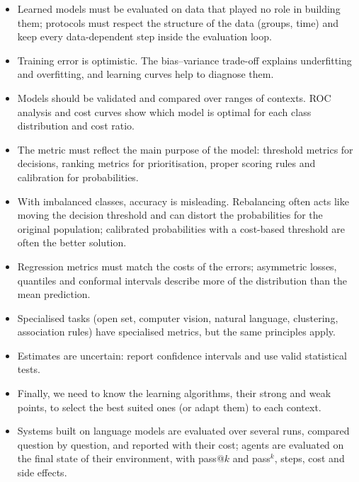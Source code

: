 \begin{itemize}
  \item Learned models must be evaluated on data that played no
        role in building them; protocols must respect the structure of the data (groups,
        time) and keep every data-dependent step inside the evaluation loop.
  \item Training error is optimistic. The bias--variance trade-off explains underfitting and
        overfitting, and learning curves help to diagnose them.
  \item Models should be validated and compared over ranges of contexts. ROC analysis and cost
        curves show which model is optimal for each class distribution and cost ratio.
  \item The metric must reflect the main purpose of the model: threshold metrics for decisions,
        ranking metrics for prioritisation, proper scoring rules and calibration for
        probabilities.
  \item With imbalanced classes, accuracy is misleading. Rebalancing often acts like moving the decision
        threshold and can distort the probabilities for the original population; calibrated probabilities with a cost-based
        threshold are often the better solution.
  \item Regression metrics must match the costs of the errors; asymmetric losses, quantiles and
        conformal intervals describe more of the distribution than the mean prediction.
  \item Specialised tasks (open set, computer vision, natural language, clustering, association
        rules) have specialised metrics, but the same principles apply.
  \item Estimates are uncertain: report confidence intervals and use valid statistical tests.
  \item Finally, we need to know the learning algorithms, their strong and weak points, to select
        the best suited ones (or adapt them) to each context.
\item Systems built on language models are evaluated over several runs, compared question by question,
and reported with their cost; agents are evaluated on the final state of their environment, with
pass@$k$ and pass$^k$, steps, cost and side effects.
\end{itemize}

